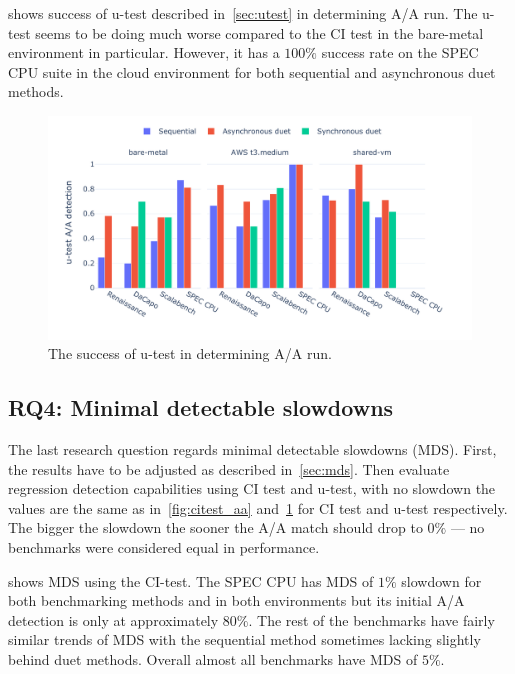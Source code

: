  shows success of \mbox{u-test} described in~\cref{sec:utest} in determining A/A run.
The \mbox{u-test} seems to be doing much worse compared to the CI test in the \mbox{bare-metal} environment in particular.
However, it has a $100\%$ success rate on the SPEC CPU suite in the cloud environment for both sequential and asynchronous duet methods.

\begin{figure}
	\centering
	\includegraphics[width=1\linewidth]{./figures/utest_aa_match.pdf}
	\caption{
		The success of \mbox{u-test} in determining A/A run.
	}
	\label{fig:utest_aa}
\end{figure}

\subsection{RQ4: Minimal detectable slowdowns}
\label{sec:rq4}

The last research question regards minimal detectable slowdowns (MDS).
First, the results have to be adjusted as described in~\cref{sec:mds}.
Then evaluate regression detection capabilities using CI test and \mbox{u-test}, with no slowdown the values are the same as in~\cref{fig:citest_aa} and~\cref{fig:utest_aa} for CI test and \mbox{u-test} respectively.
The bigger the slowdown the sooner the A/A match should drop to $0\%$ --- no benchmarks were considered equal in performance.

 shows MDS using the CI-test.
The SPEC CPU has MDS of $1\%$ slowdown for both benchmarking methods and in both environments but its initial A/A detection is only at approximately $80\%$.
The rest of the benchmarks have fairly similar trends of MDS with the sequential method sometimes lacking slightly behind duet methods.
Overall almost all benchmarks have MDS of $5\%$.

